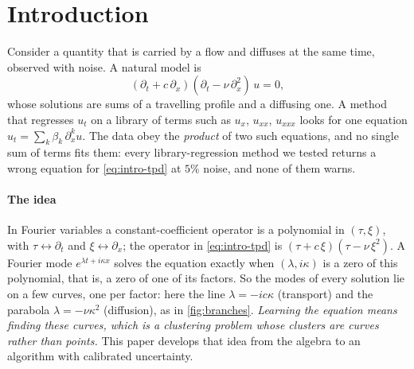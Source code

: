 \section{Introduction}\label{sec:intro}
Consider a quantity that is carried by a flow and diffuses at the same time, observed with noise. A natural model is
\begin{equation}\label{eq:intro-tpd}
  (\partial_t+c\,\partial_x)(\partial_t-\nu\,\partial_x^2)\,u=0,
\end{equation}
whose solutions are sums of a travelling profile and a diffusing one. A method that regresses $u_t$ on a library of
terms such as $u_x$, $u_{xx}$, $u_{xxx}$ looks for one equation $u_t=\sum_k\beta_k\,\partial_x^ku$. The data obey the
\emph{product} of two such equations, and no single sum of terms fits them: every library-regression method we tested
returns a wrong equation for \eqref{eq:intro-tpd} at $5\%$ noise, and none of them warns.

\paragraph{The idea} In Fourier variables a constant-coefficient operator is a polynomial in $(\tau,\xi)$, with
$\tau\leftrightarrow\partial_t$ and $\xi\leftrightarrow\partial_x$; the operator in \eqref{eq:intro-tpd} is
$(\tau+c\,\xi)(\tau-\nu\,\xi^2)$. A Fourier mode $e^{\lambda t+i\kappa x}$ solves the equation exactly when $(\lambda,i\kappa)$
is a zero of this polynomial, that is, a zero of one of its factors. So the modes of every solution lie on a few curves,
one per factor: here the line $\lambda=-ic\kappa$ (transport) and the parabola $\lambda=-\nu\kappa^2$ (diffusion), as in
\cref{fig:branches}. \emph{Learning the equation means finding these curves, which is a clustering problem whose
clusters are curves rather than points.} This paper develops that idea from the algebra to an algorithm with calibrated
uncertainty.

